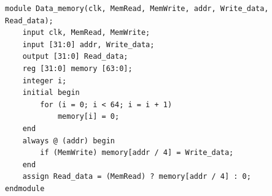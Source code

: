 \documentclass{article}
\begin{document}
\begin{lstlisting}
module Data_memory(clk, MemRead, MemWrite, addr, Write_data, Read_data);
    input clk, MemRead, MemWrite;
    input [31:0] addr, Write_data;
    output [31:0] Read_data;
    reg [31:0] memory [63:0];
    integer i;
    initial begin
        for (i = 0; i < 64; i = i + 1)
            memory[i] = 0;
    end
    always @ (addr) begin
        if (MemWrite) memory[addr / 4] = Write_data;
    end
    assign Read_data = (MemRead) ? memory[addr / 4] : 0;
endmodule

\end{lstlisting}
\end{document}
